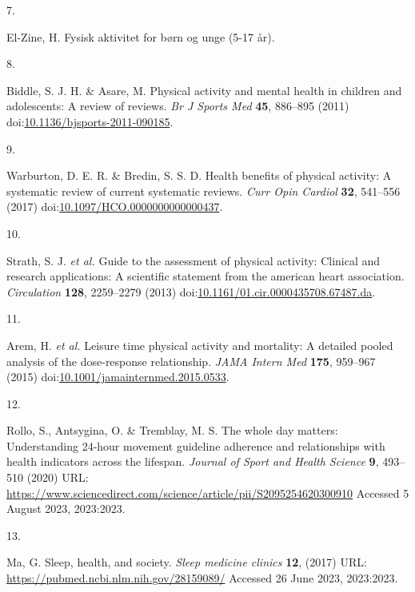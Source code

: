 \documentclass[
  9pt,
]{scrbook}
\newlength{\cslhangindent}
\newlength{\csllabelwidth}
\newlength{\cslentryspacingunit} %
\newenvironment{CSLReferences}[2] %
 {%
  \setlength{\parindent}{0pt}
  \ifodd #1
  \let\oldpar\par
  \def\par{\hangindent=\cslhangindent\oldpar}
  \fi
  \setlength{\parskip}{#2\cslentryspacingunit}
 }%
 {}
\newcommand{\CSLLeftMargin}[1]{\parbox[t]{\csllabelwidth}{#1}}
\newcommand{\CSLRightInline}[1]{\parbox[t]{\linewidth - \csllabelwidth}{#1}\break}
\begin{document}
\begin{CSLReferences}{0}{0}
\leavevmode{}%
\CSLLeftMargin{7. }%
\CSLRightInline{El-Zine, H. Fysisk aktivitet for børn og unge (5-17
år).}

\leavevmode{}%
\CSLLeftMargin{8. }%
\CSLRightInline{Biddle, S. J. H. \& Asare, M. Physical activity and
mental health in children and adolescents: A review of reviews. \emph{Br
J Sports Med} \textbf{45}, 886--895 (2011)
doi:\href{https://doi.org/10.1136/bjsports-2011-090185}{10.1136/bjsports-2011-090185}.}

\leavevmode{}%
\CSLLeftMargin{9. }%
\CSLRightInline{Warburton, D. E. R. \& Bredin, S. S. D. Health benefits
of physical activity: A systematic review of current systematic reviews.
\emph{Curr Opin Cardiol} \textbf{32}, 541--556 (2017)
doi:\href{https://doi.org/10.1097/HCO.0000000000000437}{10.1097/HCO.0000000000000437}.}

\leavevmode{}%
\CSLLeftMargin{10. }%
\CSLRightInline{Strath, S. J. \emph{et al.} Guide to the assessment of
physical activity: Clinical and research applications: A scientific
statement from the american heart association. \emph{Circulation}
\textbf{128}, 2259--2279 (2013)
doi:\href{https://doi.org/10.1161/01.cir.0000435708.67487.da}{10.1161/01.cir.0000435708.67487.da}.}

\leavevmode{}%
\CSLLeftMargin{11. }%
\CSLRightInline{Arem, H. \emph{et al.} Leisure time physical activity
and mortality: A detailed pooled analysis of the dose-response
relationship. \emph{{JAMA} Intern Med} \textbf{175}, 959--967 (2015)
doi:\href{https://doi.org/10.1001/jamainternmed.2015.0533}{10.1001/jamainternmed.2015.0533}.}

\leavevmode{}%
\CSLLeftMargin{12. }%
\CSLRightInline{Rollo, S., Antsygina, O. \& Tremblay, M. S. The whole
day matters: Understanding 24-hour movement guideline adherence and
relationships with health indicators across the lifespan. \emph{Journal
of Sport and Health Science} \textbf{9}, 493--510 (2020) URL:
\url{https://www.sciencedirect.com/science/article/pii/S2095254620300910}
Accessed 5 August 2023, 2023:2023.}

\leavevmode{}%
\CSLLeftMargin{13. }%
\CSLRightInline{Ma, G. Sleep, health, and society. \emph{Sleep medicine
clinics} \textbf{12}, (2017) URL:
\url{https://pubmed.ncbi.nlm.nih.gov/28159089/} Accessed 26 June 2023,
2023:2023.}


\end{CSLReferences}
\end{document}
